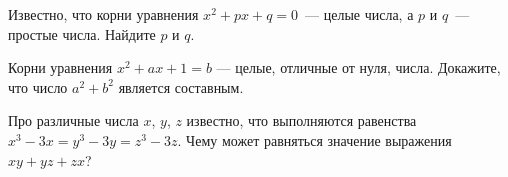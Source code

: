 \documentclass{article}
\begin{document}
\begin{enumerate_boxed}
        \item Известно, что корни уравнения  $x^2 + px + q = 0$~--- целые числа, а $p$ и $q$~--- простые числа.
        Найдите $p$ и $q$.

        \item  Корни уравнения $x^2 + ax + 1 = b$ --- целые, отличные от нуля, числа.
        Докажите, что число
        $a^2 + b^2$ является составным.

        \item Про различные числа $x$, $y$, $z$ известно, что выполняются равенства $x^3 - 3x = y^3 - 3y = z^3 - 3z$.
        Чему может равняться значение выражения $xy + yz + zx$?

    \end{enumerate_boxed}
\end{document}
